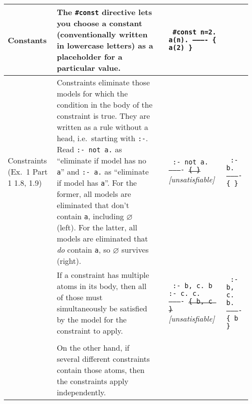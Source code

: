 \documentclass[9pt,a4paper,landscape]{article}
\begin{document}
{\begin{longtable}{Lp{14.5cm}lXX}
Constants
& The \texttt{\#const} directive lets you choose a constant (conventionally written in lowercase letters) as a placeholder for a particular value.
&& \texttt{%
	\#const n=2. \newline
	a(n). \newline
	---------- \newline
	\{ a(2) \}} & \\ \midrule


Constraints \newline (Ex.\ 1 Part 1  1.8, 1.9)
& Constraints eliminate those models for which the condition in the body of the constraint is true.
They are written as a rule without a head, i.e.\ starting with \texttt{:-}.
Read \texttt{:- not a.} as ``eliminate if model has no \texttt{a}'' and \texttt{:- a.} as ``eliminate if model has \texttt{a}''.
For the former, all models are eliminated that don't contain \texttt{a}, including $\varnothing$ (left).
For the latter, all models are eliminated that \textit{do} contain \texttt{a}, so $\varnothing$ survives (right).

&& \texttt{%
	:- not a. \newline
	---------- \newline
	\sout{\{ \}}} \newline		
\textit{[unsatisfiable]}
& \texttt{%
	:- b. \newline
	---------- \newline
	\{ \} } \\

& If a constraint has multiple atoms in its body, then all of those must simultaneously be satisfied by the model for the constraint to apply.

&& \texttt{%
	:- b, c. \newline
	b :- c. \newline
	c. \newline
	---------- \newline
	\sout{\{ b, c \}} } \newline
\textit{[unsatisfiable]}
& \texttt{%
	:- b, c. \newline
	b. \newline
	---------- \newline
	\{ b \}} \\ &\\

& On the other hand, if several different constraints contain those atoms, then the constraints apply independently. \newline


\end{longtable}}
\end{document}
